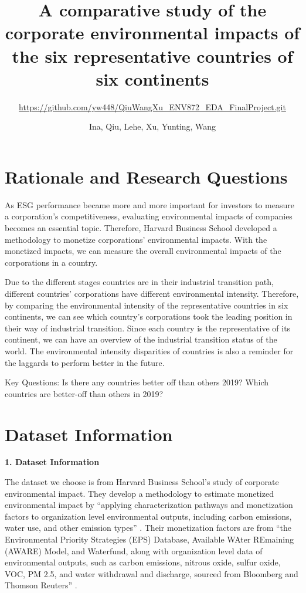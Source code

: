 \documentclass[
  12pt,
]{article}
\title{A comparative study of the corporate environmental impacts of the
six representative countries of six continents}
\subtitle{\url{https://github.com/yw448/QiuWangXu_ENV872_EDA_FinalProject.git}}
\author{Ina, Qiu, Lehe, Xu, Yunting, Wang}
\date{}
\begin{document}
\maketitle

\newpage
\tableofcontents 
\newpage
\listoftables 
\newpage
\listoffigures 
\newpage

\hypertarget{rationale-and-research-questions}{%
\section{Rationale and Research
Questions}\label{rationale-and-research-questions}}

As ESG performance became more and more important for investors to
measure a corporation's competitiveness, evaluating environmental
impacts of companies becomes an essential topic. Therefore, Harvard
Business School developed a methodology to monetize corporations'
environmental impacts. With the monetized impacts, we can measure the
overall environmental impacts of the corporations in a country.

Due to the different stages countries are in their industrial transition
path, different countries' corporations have different environmental
intensity. Therefore, by comparing the environmental intensity of the
representative countries in six continents, we can see which country's
corporations took the leading position in their way of industrial
transition. Since each country is the representative of its continent,
we can have an overview of the industrial transition status of the
world. The environmental intensity disparities of countries is also a
reminder for the laggards to perform better in the future.

Key Questions: Is there any countries better off than others 2019? Which
countries are better-off than others in 2019?

\newpage

\hypertarget{dataset-information}{%
\section{Dataset Information}\label{dataset-information}}

\textbf{1. Dataset Information}

The dataset we choose is from Harvard Business School's study of
corporate environmental impact. They develop a methodology to estimate
monetized environmental impact by ``applying characterization pathways
and monetization factors to organization level environmental outputs,
including carbon emissions, water use, and other emission types'' .
Their monetization factors are from ``the Environmental Priority
Strategies (EPS) Database, Available WAter REmaining (AWARE) Model, and
Waterfund, along with organization level data of environmental outputs,
such as carbon emissions, nitrous oxide, sulfur oxide, VOC, PM 2.5, and
water withdrawal and discharge, sourced from Bloomberg and Thomson
Reuters'' .
\end{document}
